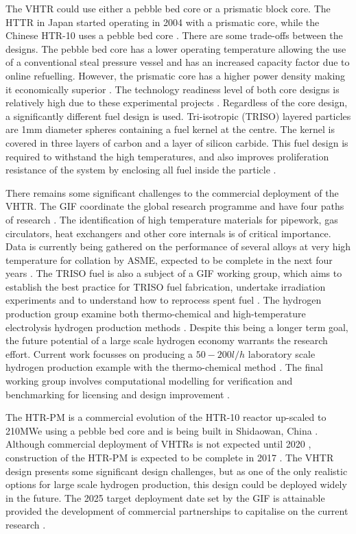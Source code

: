 \documentclass[journal]{IEEEtran}
\begin{document}
The VHTR could use either a pebble bed core or a prismatic block core.
The HTTR in Japan started operating in 2004 with a prismatic core, while the Chinese HTR-10 uses a pebble bed core \cite{Ftterer2014}.
There are some trade-offs between the designs.
The pebble bed core has a lower operating temperature allowing the use of a conventional steal pressure vessel and has an increased capacity factor due to online refuelling.
However, the prismatic core has a higher power density making it economically superior \cite{Locatelli2013}.
The technology readiness level of both core designs is relatively high due to these experimental projects \cite{Ftterer2014}.
Regardless of the core design, a significantly different fuel design is used.
Tri-isotropic (TRISO) layered particles are 1mm diameter spheres containing a fuel kernel at the centre.
The kernel is covered in three layers of carbon and a layer of silicon carbide.
This fuel design is required to withstand the high temperatures, and also improves proliferation resistance of the system by enclosing all fuel inside the particle \cite{Marques2010a}.

There remains some significant challenges to the commercial deployment of the VHTR. 
The GIF coordinate the global research programme and have four paths of research \cite{GenIVForum}.
The identification of high temperature materials for pipework, gas circulators, heat exchangers and other core internals is of critical importance. 
Data is currently being gathered on the performance of several alloys at very high temperature for collation by ASME, expected to be complete in the next four years \cite{Ftterer2014}.
The TRISO fuel is also a subject of a GIF working group, which aims to establish the best practice for TRISO fuel fabrication, undertake irradiation experiments \cite{Ftterer2014} and to understand how to reprocess spent fuel \cite{GenIVForum}. 
The hydrogen production group examine both thermo-chemical and high-temperature electrolysis hydrogen production methods \cite{GenIVForum}.
Despite this being a longer term goal, the future potential of a large scale hydrogen economy warrants the research effort.
Current work focusses on producing a $50-200l/h$ laboratory scale hydrogen production example with the thermo-chemical method \cite{Ftterer2014}.
The final working group involves computational modelling for verification and benchmarking for licensing and design improvement \cite{GenIVForum}.

The HTR-PM is a commercial evolution of the HTR-10 reactor up-scaled to 210MWe using a pebble bed core and is being built in Shidaowan, China \cite{Locatelli2013}.
Although commercial deployment of VHTRs is not expected until 2020 \cite{GenIVRoadmap}, construction of the HTR-PM is expected to be complete in 2017 \cite{Ftterer2014}. 
The VHTR design presents some significant design challenges, but as one of the only realistic options for large scale hydrogen production, this design could be deployed widely in the future.
The 2025 target deployment date set by the GIF \cite{GenIVRoadmap} is attainable provided the development of commercial partnerships to capitalise on the current research \cite{Ftterer2014}.
\end{document}

